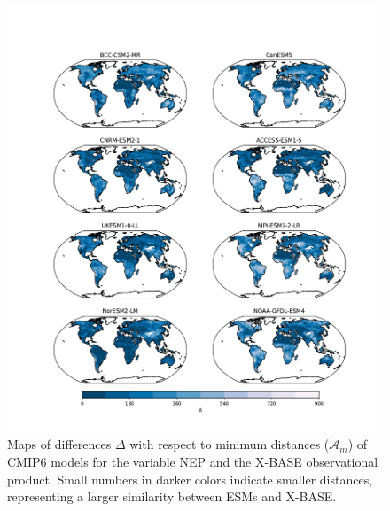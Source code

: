 \documentclass[gmd, manuscript]{copernicus}
\begin{document}
\begin{figure}[htbp]
   \centering
   \includegraphics[width=16cm]{Figures/CMIP6_FLUXCOM-X_D.pdf} %
   \caption{Maps of differences $\Delta$ with respect to minimum distances ($\mathcal{A}_m$) of CMIP6 models for the variable NEP and the X-BASE observational product. Small numbers in darker colors indicate smaller distances, representing a larger similarity between ESMs and X-BASE.}
   \label{fig:Delta_NEP}
\end{figure}
\end{document}

